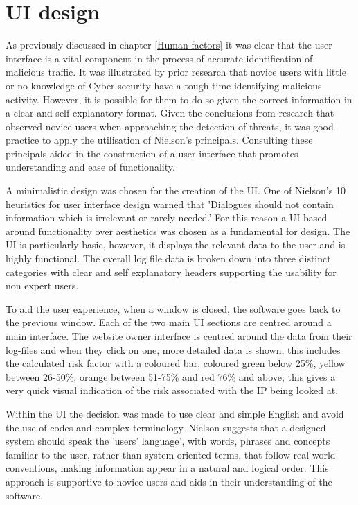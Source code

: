 \section{UI design} \label{ui}

As previously discussed in chapter \ref{Human factors} it was clear that the user interface is a vital component in the process of accurate identification of malicious traffic. It was illustrated by prior research that novice users with little or no knowledge of Cyber security have a tough time identifying malicious activity. However, it is possible for them to do so given the correct information in a clear and self explanatory format. Given the conclusions from research that observed novice users when approaching the detection of threats, it was good practice to apply the utilisation of Nielson's principals. Consulting these principals aided in the construction of a user interface that promotes understanding and ease of functionality.

A minimalistic design was chosen for the creation of the UI. One of Nielson's 10 heuristics for user interface design warned that 'Dialogues should not contain information which is irrelevant or rarely needed.' For this reason a UI based around functionality over aesthetics was chosen as a fundamental for design. The UI is particularly basic, however, it displays the relevant data to the user and is highly functional. The overall log file data is broken down into three distinct categories with clear and self explanatory headers supporting the usability for non expert users.

To aid the user experience, when a window is closed, the software goes back to the previous window. Each of the two main UI sections are centred around a main interface. The website owner interface is centred around the data from their log-files and when they click on one, more detailed data is shown, this includes the calculated risk factor with a coloured bar, coloured green below 25\%, yellow between 26-50\%, orange between 51-75\% and red 76\% and above; this gives a very quick visual indication of the risk associated with the IP being looked at. 

Within the UI the decision was made to use clear and simple English and avoid the use of codes and complex terminology. Nielson suggests that a designed system should speak the 'users' language', with words, phrases and concepts familiar to the user, rather than system-oriented terms, that follow real-world conventions, making information appear in a natural and logical order. This approach is supportive to novice users and aids in their understanding of the software.

